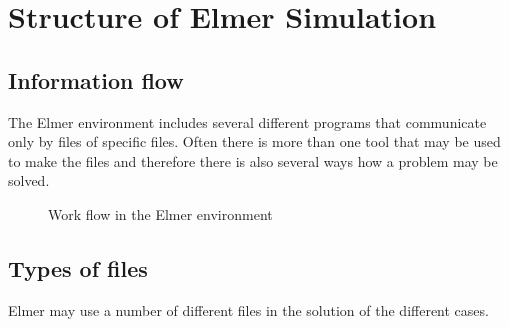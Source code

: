 \appendix
\chapter{Structure of Elmer Simulation}

\section{Information flow}

The Elmer environment includes several different programs that 
communicate only by files of specific files. Often there is
more than one tool that may be used to make the files and 
therefore there is also several ways how a problem may be solved.


\begin{figure}[tbhp]
\vspace{10mm}
\begin{center}
\caption{Work flow in the Elmer environment}
\end{center}
\end{figure}


\section{Types of files}

Elmer may use a number of different files in the solution of the
different cases.

